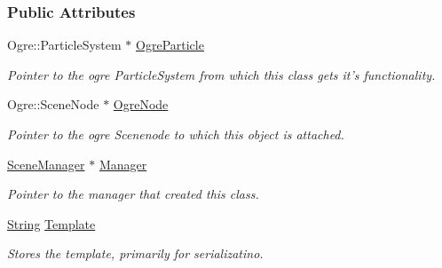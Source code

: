 \subsubsection*{Public Attributes}
\begin{DoxyCompactItemize}
\item 
\hypertarget{structphys_1_1internal_1_1ParticleEffectInternalData_a2a9776a843e39608d4a4583e4558a2c0}{
Ogre::ParticleSystem $\ast$ \hyperlink{structphys_1_1internal_1_1ParticleEffectInternalData_a2a9776a843e39608d4a4583e4558a2c0}{OgreParticle}}
\label{d6/d85/structphys_1_1internal_1_1ParticleEffectInternalData_a2a9776a843e39608d4a4583e4558a2c0}

\begin{DoxyCompactList}\small\item\em Pointer to the ogre ParticleSystem from which this class gets it's functionality. \item\end{DoxyCompactList}\item 
\hypertarget{structphys_1_1internal_1_1ParticleEffectInternalData_a339dac2408197459041f2524badc619e}{
Ogre::SceneNode $\ast$ \hyperlink{structphys_1_1internal_1_1ParticleEffectInternalData_a339dac2408197459041f2524badc619e}{OgreNode}}
\label{d6/d85/structphys_1_1internal_1_1ParticleEffectInternalData_a339dac2408197459041f2524badc619e}

\begin{DoxyCompactList}\small\item\em Pointer to the ogre Scenenode to which this object is attached. \item\end{DoxyCompactList}\item 
\hypertarget{structphys_1_1internal_1_1ParticleEffectInternalData_a6e039c2445dcaac7f9a586863affe030}{
\hyperlink{classphys_1_1SceneManager}{SceneManager} $\ast$ \hyperlink{structphys_1_1internal_1_1ParticleEffectInternalData_a6e039c2445dcaac7f9a586863affe030}{Manager}}
\label{d6/d85/structphys_1_1internal_1_1ParticleEffectInternalData_a6e039c2445dcaac7f9a586863affe030}

\begin{DoxyCompactList}\small\item\em Pointer to the manager that created this class. \item\end{DoxyCompactList}\item 
\hypertarget{structphys_1_1internal_1_1ParticleEffectInternalData_a5c9857e01d36e5957887c1853042bcf2}{
\hyperlink{namespacephys_aa03900411993de7fbfec4789bc1d392e}{String} \hyperlink{structphys_1_1internal_1_1ParticleEffectInternalData_a5c9857e01d36e5957887c1853042bcf2}{Template}}
\label{d6/d85/structphys_1_1internal_1_1ParticleEffectInternalData_a5c9857e01d36e5957887c1853042bcf2}

\begin{DoxyCompactList}\small\item\em Stores the template, primarily for serializatino. \item\end{DoxyCompactList}\end{DoxyCompactItemize}


